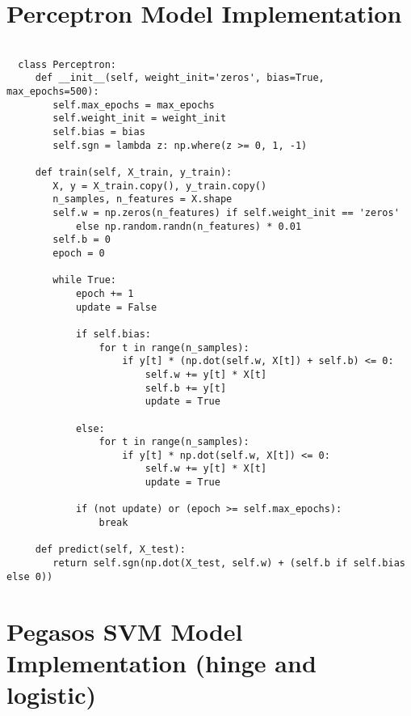 \section{Perceptron Model Implementation}\label{appendix:perceptron}

\begin{verbatim}

  class Perceptron:
     def __init__(self, weight_init='zeros', bias=True, max_epochs=500):
        self.max_epochs = max_epochs
        self.weight_init = weight_init
        self.bias = bias
        self.sgn = lambda z: np.where(z >= 0, 1, -1)

     def train(self, X_train, y_train):
        X, y = X_train.copy(), y_train.copy()
        n_samples, n_features = X.shape
        self.w = np.zeros(n_features) if self.weight_init == 'zeros'
            else np.random.randn(n_features) * 0.01
        self.b = 0
        epoch = 0

        while True:
            epoch += 1
            update = False

            if self.bias:
                for t in range(n_samples):
                    if y[t] * (np.dot(self.w, X[t]) + self.b) <= 0:
                        self.w += y[t] * X[t]
                        self.b += y[t]
                        update = True

            else:
                for t in range(n_samples):
                    if y[t] * np.dot(self.w, X[t]) <= 0:
                        self.w += y[t] * X[t]
                        update = True

            if (not update) or (epoch >= self.max_epochs):
                break

     def predict(self, X_test):
        return self.sgn(np.dot(X_test, self.w) + (self.b if self.bias else 0))

\end{verbatim}


\section{Pegasos SVM Model Implementation (hinge and logistic)}\label{appendix:pegasos}

